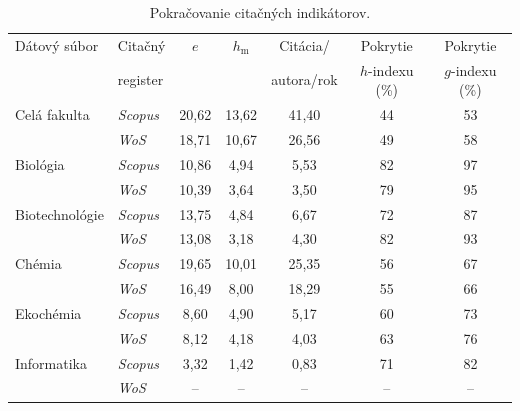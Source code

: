 \begin{table}
\centering\small
\begin{tabular}{llccccc}
  \hline\noalign{\vspace{.3ex}}
  Dátový súbor & Citačný  & $e$ & $h_{\mathrm{m}}$ & Citácia/   & Pokrytie        & Pokrytie        \\
               & register &     &               & autora/rok & $h$-indexu (\%) & $g$-indexu (\%) \\[0.3ex]
  \hline\noalign{\vspace{.5ex}}
  Celá fakulta   & \emph{Scopus} & 20,62 & 13,62 & 41,40 & 44 & 53 \\
                 & \emph{WoS}    & 18,71 & 10,67 & 26,56 & 49 & 58 \\[1ex]
  Biológia       & \emph{Scopus} & 10,86 &  4,94 &  5,53 & 82 & 97 \\
                 & \emph{WoS}    & 10,39 &  3,64 &  3,50 & 79 & 95 \\[1ex]
  Biotechnológie & \emph{Scopus} & 13,75 &  4,84 &  6,67 & 72 & 87 \\
                 & \emph{WoS}    & 13,08 &  3,18 &  4,30 & 82 & 93 \\[1ex]
  Chémia         & \emph{Scopus} & 19,65 & 10,01 & 25,35 & 56 & 67 \\
                 & \emph{WoS}    & 16,49 &  8,00 & 18,29 & 55 & 66 \\[1ex]
  Ekochémia      & \emph{Scopus} &  8,60 &  4,90 &  5,17 & 60 & 73 \\
                 & \emph{WoS}    &  8,12 &  4,18 &  4,03 & 63 & 76 \\[1ex]
  Informatika    & \emph{Scopus} &  3,32 &  1,42 &  0,83 & 71 & 82 \\
                 & \emph{WoS}    & --    & --    & --    & -- & -- \\[0.5ex]
  \hline
\end{tabular}
\caption{Pokračovanie citačných indikátorov.}
\label{tab:citation.indicators2}
\end{table}


